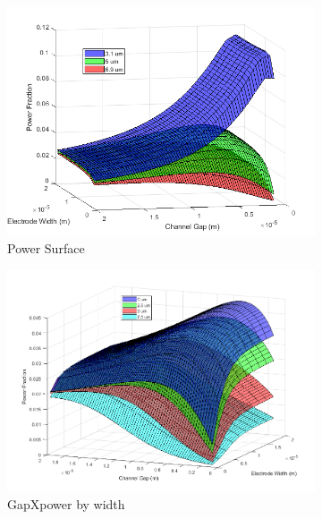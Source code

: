 \begin{figure}[h]
    \centering
    \begin{subfigure}[b]{0.49\textwidth}
        \centering
        \includegraphics[width=\textwidth]{images/analytic_vertical_power.png}
        \caption{Power Surface}
    \end{subfigure}
    \hfill
    \begin{subfigure}[b]{0.49\textwidth}
        \centering
        \includegraphics[width=\textwidth]{images/analytic_horizontal_power.png}
        \caption{GapXpower by width}
    \end{subfigure}
    \\
    \vspace{0.1 in}
    \begin{subfigure}[b]{0.49\textwidth}

\end{subfigure}
\end{figure}
